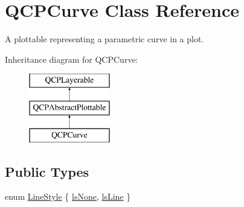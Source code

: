 \hypertarget{classQCPCurve}{\section{\-Q\-C\-P\-Curve \-Class \-Reference}
\label{classQCPCurve}
}


\-A plottable representing a parametric curve in a plot.  


\-Inheritance diagram for \-Q\-C\-P\-Curve\-:\begin{figure}[H]
\begin{center}
\leavevmode
\includegraphics[height=3.000000cm]{classQCPCurve}
\end{center}
\end{figure}
\subsection*{\-Public \-Types}
\begin{DoxyCompactItemize}
\item 
enum \hyperlink{classQCPCurve_a2710e9f79302152cff794c6e16cc01f1}{\-Line\-Style} \{ \hyperlink{classQCPCurve_a2710e9f79302152cff794c6e16cc01f1aec1601a191cdf0b4e761c4c66092cc48}{ls\-None}, 
\hyperlink{classQCPCurve_a2710e9f79302152cff794c6e16cc01f1ade5822ce6fbf131d3df131795c2e1003}{ls\-Line}
 \}
\end{DoxyCompactItemize}
